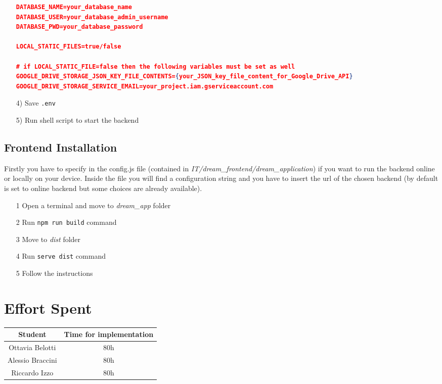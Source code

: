 \documentclass[table, 12pt]{article}
\begin{document}
\begin{itemize}
\begin{lstlisting}[language=json]
DATABASE_NAME=your_database_name
DATABASE_USER=your_database_admin_username
DATABASE_PWD=your_database_password

LOCAL_STATIC_FILES=true/false

# if LOCAL_STATIC_FILE=false then the following variables must be set as well
GOOGLE_DRIVE_STORAGE_JSON_KEY_FILE_CONTENTS={your_JSON_key_file_content_for_Google_Drive_API}
GOOGLE_DRIVE_STORAGE_SERVICE_EMAIL=your_project.iam.gserviceaccount.com
    \end{lstlisting}  
    \item[4)] Save \texttt{.env}
    \item[5)] Run shell script to start the backend 
\end{itemize}

\subsection{Frontend Installation}
Firstly you have to specify in the config.js file (contained in \newline \textit{IT/dream\_frontend/dream\_application}) if you want to run the backend online or locally on your device.
Inside the file you will find a configuration string and you have to insert the url of the chosen backend
(by default is set to online backend but some choices are already available).

\begin{itemize}
    \item [1] Open a terminal and move to \textit{dream\_app} folder
    \item [2] Run \texttt{npm run build} command
    \item [3] Move to \textit{dist} folder
    \item [4] Run \texttt{serve dist} command
    \item [5] Follow the instructions
\end{itemize}

\section{Effort Spent}
\begin{tabular}{|c||c|}
    \hline
    Student & Time for implementation\\ \hline
    Ottavia Belotti & 80h\\
    Alessio Braccini & 80h\\
    Riccardo Izzo & 80h\\
    \hline
\end{tabular}
\end{document}

